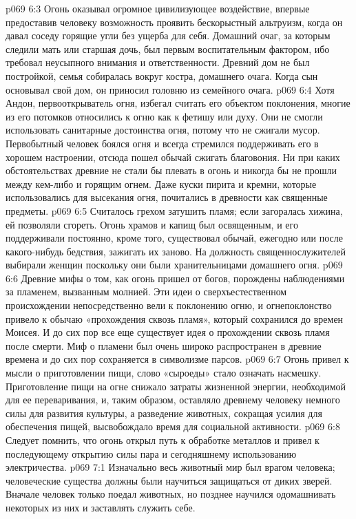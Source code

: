 \vs p069 6:3 Огонь оказывал огромное цивилизующее воздействие, впервые предоставив человеку возможность проявить бескорыстный альтруизм, когда он давал соседу горящие угли без ущерба для себя. Домашний очаг, за которым следили мать или старшая дочь, был первым воспитательным фактором, ибо требовал неусыпного внимания и ответственности. Древний дом не был постройкой, семья собиралась вокруг костра, домашнего очага. Когда сын основывал свой дом, он приносил головню из семейного очага.
\vs p069 6:4 \pc Хотя Андон, первооткрыватель огня, избегал считать его объектом поклонения, многие из его потомков относились к огню как к фетишу или духу. Они не смогли использовать санитарные достоинства огня, потому что не сжигали мусор. Первобытный человек боялся огня и всегда стремился поддерживать его в хорошем настроении, отсюда пошел обычай сжигать благовония. Ни при каких обстоятельствах древние не стали бы плевать в огонь и никогда бы не прошли между кем\hyp{}либо и горящим огнем. Даже куски пирита и кремни, которые использовались для высекания огня, почитались в древности как священные предметы.
\vs p069 6:5 Считалось грехом затушить пламя; если загоралась хижина, ей позволяли сгореть. Огонь храмов и капищ был освященным, и его поддерживали постоянно, кроме того, существовал обычай, ежегодно или после какого\hyp{}нибудь бедствия, зажигать их заново. На должность священнослужителей выбирали женщин поскольку они были хранительницами домашнего огня.
\vs p069 6:6 Древние мифы о том, как огонь пришел от богов, порождены наблюдениями за пламенем, вызванным молнией. Эти идеи о сверхъестественном происхождении непосредственно вели к поклонению огню, и огнепоклонство привело к обычаю «прохождения сквозь пламя», который сохранился до времен Моисея. И до сих пор все еще существует идея о прохождении сквозь пламя после смерти. Миф о пламени был очень широко распространен в древние времена и до сих пор сохраняется в символизме парсов.
\vs p069 6:7 \pc Огонь привел к мысли о приготовлении пищи, слово «сыроеды» стало означать насмешку. Приготовление пищи на огне снижало затраты жизненной энергии, необходимой для ее переваривания, и, таким образом, оставляло древнему человеку немного силы для развития культуры, а разведение животных, сокращая усилия для обеспечения пищей, высвобождало время для социальной активности.
\vs p069 6:8 Следует помнить, что огонь открыл путь к обработке металлов и привел к последующему открытию силы пара и сегодняшнему использованию электричества.
\vs p069 7:1 Изначально весь животный мир был врагом человека; человеческие существа должны были научиться защищаться от диких зверей. Вначале человек только поедал животных, но позднее научился одомашнивать некоторых из них и заставлять служить себе.
